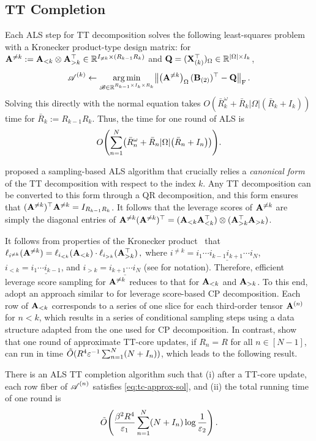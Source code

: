 \subsection{TT Completion}

Each ALS step for TT decomposition solves the following least-squares problem
with a Kronecker product-type design matrix:
for $\mathbf{A}^{\neq k} := \mathbf{A}_{< k}\otimes \mathbf{A}^\top_{> k} \in \mathbb{R}^{I_{\neq k} \times (R_{k-1}R_k)}$ and $\mathbf{Q} = (\mathbf{X}_{(k)}^\top)_\Omega \in \mathbb{R}^{|\Omega| \times I_k}$,
\[
    \tensor{A}^{(k)}
    \gets
    \argmin_{\tensor{B} \in \R^{R_{k-1}\times I_k \times R_k}}
    \norm*{\parens*{\mat{A}^{\neq k}}_\Omega\, (\mat{B}_{(2)})^\top - \mat Q }_{\frobenius}\,.
\]
Solving this directly with the normal equation takes
$O(\bar R_k^\omega +\bar R_k |\Omega| (\bar R_k + I_k))$ time for $\bar R_k := R_{k-1} R_k$.
Thus, the time for one round of ALS is
\[
    O\parens*{
        \sum_{n=1}^N \parens*{\bar R_n^\omega + \bar R_n |\Omega| \parens*{\bar R_n +I_n}}
    }.
\]

\citet{bharadwaj2024efficient} proposed a sampling-based ALS algorithm that crucially relies a \emph{canonical form} of the TT decomposition with respect to the index $k$. Any TT decomposition can be converted to this form through a QR decomposition, and this form ensures that $(\mathbf{A}^{\neq k})^\top \mathbf{A}^{\neq k} = I_{R_{k-1} R_k}$.
It follows that the leverage scores of $\mathbf{A}^{\neq k}$ are simply the diagonal entries of $\mathbf{A}^{\neq k} (\mathbf{A}^{\neq k})^\top = (\mathbf{A}_{< k}\mathbf{A}_{<k}^\top) \otimes (\mathbf{A}_{> k}^\top\mathbf{A}_{>k})$.

It follows from properties of the Kronecker product~\citep{diao2019optimal} that
$
    \ell_{i^{\neq k}}(\mathbf{A}^{\neq k})
    =
    \ell_{i_{< k}}(\mathbf{A}_{< k}) \cdot \ell_{i_{> k}}(\mathbf{A}^\top_{> k})\,,
$
where $i^{\neq k} = \underline{i_1\cdots i_{k-1} i_{k+1}\cdots i_N}$, $i_{< k} = \underline{i_1\cdots i_{k-1}}$, and $i_{> k} = \underline{i_{k+1}\cdots i_N}$ (see  for notation).
Therefore, efficient leverage score sampling for $\mathbf{A}^{\neq k}$ reduces to that for $\mathbf{A}_{< k}$ and $\mathbf{A}_{> k}$.
To this end, \citet{bharadwaj2024efficient} adopt an approach similar to \citet{bharadwaj2023fast} for leverage score-based CP decomposition.
Each row of $\mathbf{A}_{< k}$ corresponds to a series of one slice for each third-order tensor $\mathbf{A}^{(n)}$ for $n<k$, which results in a series of conditional sampling steps using a data structure adapted from the one used for CP decomposition.
In contrast, \citet[Corollary 4.4]{bharadwaj2024efficient} show that one round of approximate TT-core updates,
if $R_n = R$ for all $n \in [N-1]$, can run in time
$\tilde{O} \parens{ R^4 \varepsilon^{-1} \sum_{n = 1}^N \parens*{N + I_n}}$,
which leads to the following result.

\begin{corollary}
There is an ALS TT completion algorithm such that
(i) after a TT-core update, each row fiber of $\bm{\mathscr{A}}^{(n)}$
satisfies \eqref{eq:tc-approx-sol},
and (ii) the total running time of one round is
\[
    \tilde{O} \parens*{
        \frac{\beta^2 R^4}{\epsilon_1} \sum_{n=1}^N \parens*{N + I_n} \log\frac{1}{\epsilon_2}
    }\,.
\]
\end{corollary}
